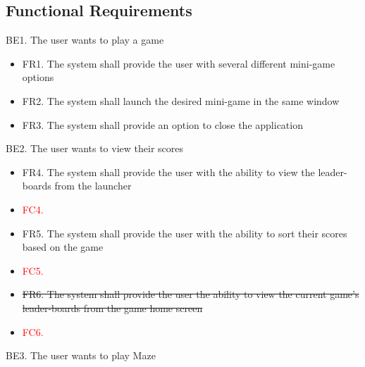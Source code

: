 \documentclass[12pt, titlepage]{article}
\begin{document}
\subsection{Functional Requirements}
    BE1. The user wants to play a game
    \begin{itemize}
    \item FR1. The system shall provide the user with several different mini-game options
    \item FR2. The system shall launch the desired mini-game in the same window
    \item FR3. The system shall provide an option to close the application
    \end{itemize}
    BE2. The user wants to view their scores
    \begin{itemize}
        \item FR4. The system shall provide the user with the ability to view the leader-boards from the launcher
        \item \textcolor{red}{FC4.}
        \item FR5. The system shall provide the user with the ability to sort their scores based on the game
        \item \textcolor{red}{FC5.}
        \item \sout{FR6. The system shall provide the user the ability to view the current game’s leader-boards from the game home screen}
        \item \textcolor{red}{FC6.}
    \end{itemize}
    BE3. The user wants to play Maze
\end{document}
